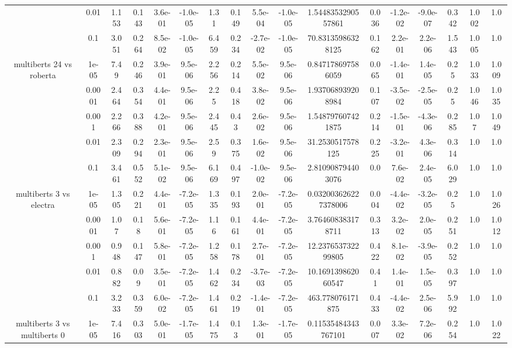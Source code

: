 \begin{tabular}{|c|c|c|c|c|c|c|c|c|c|c|c|c|c|c|c|c|}
 & 0.01 & 1.153 & 0.143 & 3.6e-01 & -1.0e-05 & 1.31 & 0.149 & 5.5e-04 & -1.0e-05 & 1.5448353290557861 & 0.036 & -1.2e-02 & -9.0e-07 & 0.342 & 1.002 & 1.0 \\
 & 0.1 & 3.051 & 0.264 & 8.5e-02 & -1.0e-05 & 6.459 & 0.234 & -2.7e-02 & -1.0e-05 & 70.83135986328125 & 0.162 & 2.2e-01 & 2.2e-06 & 1.543 & 1.005 & 1.0 \\
\hline
\multirow{5}{*}{multiberts 24 vs roberta } & 1e-05 & 7.49 & 0.246 & 3.9e-01 & 9.5e-06 & 2.256 & 0.214 & 5.5e-02 & 9.5e-06 & 0.847178697586059 & 0.065 & -1.4e-01 & 1.4e-05 & 0.25 & 1.033 & 1.009 \\
 & 0.0001 & 2.464 & 0.354 & 4.4e-01 & 9.5e-06 & 2.25 & 0.418 & 3.8e-02 & 9.5e-06 & 1.937068939208984 & 0.107 & -3.5e-02 & -2.5e-05 & 0.25 & 1.046 & 1.035 \\
 & 0.001 & 2.266 & 0.388 & 4.2e-01 & 9.5e-06 & 2.445 & 0.43 & 2.6e-02 & 9.5e-06 & 1.548797607421875 & 0.214 & -1.5e-01 & -4.3e-06 & 0.285 & 1.07 & 1.049 \\
 & 0.01 & 2.309 & 0.294 & 2.3e-01 & 9.5e-06 & 2.59 & 0.375 & 1.6e-02 & 9.5e-06 & 31.2530517578125 & 0.225 & -3.2e-01 & 4.3e-06 & 0.314 & 1.0 & 1.0 \\
 & 0.1 & 3.461 & 0.552 & 5.1e-02 & 9.5e-06 & 6.169 & 0.497 & -1.0e-02 & 9.5e-06 & 2.810908794403076 & 0.0 & 7.6e-02 & 2.4e-05 & 6.029 & 1.0 & 1.0 \\
\hline
\multirow{5}{*}{multiberts 3 vs electra } & 1e-05 & 1.305 & 0.221 & 4.4e-01 & -7.2e-05 & 1.335 & 0.193 & 2.0e-01 & -7.2e-05 & 0.032003626227378006 & 0.004 & -4.4e-02 & -3.2e-05 & 0.25 & 1.0 & 1.026 \\
 & 0.0001 & 1.07 & 0.18 & 5.6e-01 & -7.2e-05 & 1.16 & 0.161 & 4.4e-01 & -7.2e-05 & 3.764608383178711 & 0.313 & 3.2e-02 & 2.0e-05 & 0.251 & 1.0 & 1.012 \\
 & 0.001 & 0.948 & 0.147 & 5.8e-01 & -7.2e-05 & 1.258 & 0.178 & 2.7e-01 & -7.2e-05 & 12.237653732299805 & 0.422 & 8.1e-02 & -3.9e-05 & 0.252 & 1.0 & 1.0 \\
 & 0.01 & 0.882 & 0.09 & 3.5e-01 & -7.2e-05 & 1.462 & 0.234 & -3.7e-03 & -7.2e-05 & 10.169139862060547 & 0.41 & 1.4e-01 & 1.5e-05 & 0.397 & 1.0 & 1.0 \\
 & 0.1 & 3.233 & 0.359 & 6.0e-02 & -7.2e-05 & 1.461 & 0.219 & -1.4e-01 & -7.2e-05 & 463.778076171875 & 0.433 & -4.4e-02 & 2.5e-06 & 5.992 & 1.0 & 1.0 \\
\hline
\multirow{5}{*}{multiberts 3 vs multiberts 0} & 1e-05 & 7.416 & 0.303 & 5.0e-01 & -1.7e-05 & 1.475 & 0.13 & 1.3e-01 & -1.7e-05 & 0.11535484343767101 & 0.007 & 3.3e-02 & 7.2e-06 & 0.254 & 1.0 & 1.022 \\

\end{tabular}
